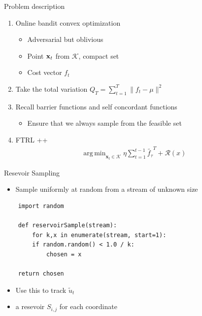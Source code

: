 \documentclass{beamer}
\DeclareMathOperator*{\argmin}{arg\,min}
\begin{document}
\begin{frame}{Problem description}
  \begin{enumerate}
    \item
    Online bandit convex optimization
    \begin{itemize}
      \item
        Adversarial but oblivious
      \item
        Point ${\bf x}_t$ from $\mathcal{K}$, compact set
      \item
        Cost vector $f_{t}$
      \end{itemize}
    \item
      Take the total variation
      $Q_T=\sum_{t=1}^T \| f_t - \mu \|^2$
    \item
      Recall barrier functions and self concordant functions
      \begin{itemize}
        \item
          Ensure that we always sample from the feasible set
        \end{itemize}
     \item
       FTRL ++
        \begin{align*}
          \argmin_{{\textbf{x}}_t\in\mathcal{K}}\eta \sum_{t=1}^{t-1} \tilde{f_{\tau}}^T + \mathcal{R}(x)
        \end{align*}

    \end{enumerate}
  \end{frame}
       
\begin{frame}[fragile]{Resevoir Sampling}
  \begin{itemize}
  \item
      Sample uniformly at random from a stream of unknown size \footnotemark
 \end{itemize}

  \lstset{language=Python}
  \lstset{frame=lines}
  \lstset{basicstyle=\footnotesize}
  \begin{lstlisting}
    import random

    def reservoirSample(stream):
        for k,x in enumerate(stream, start=1):
        if random.random() < 1.0 / k:
            chosen = x

    return chosen
  \end{lstlisting}
  \begin{itemize}
    \item
      Use this to track $\tilde{u}_t$
     \item
       a resevoir $S_{i,j}$ for each coordinate 
  \end{itemize}
\end{frame}
\end{document}
